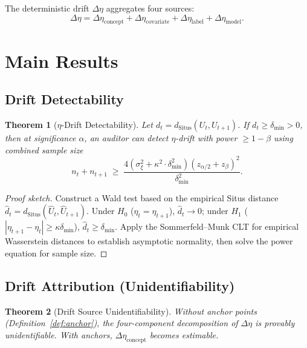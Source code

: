 \documentclass[12pt,a4paper]{article}
\newtheorem{theorem}{Theorem}[section]
\newcommand{\Situs}{\mathrm{Situs}}
\begin{document}
The deterministic drift $\Delta\eta$ aggregates four sources:
\begin{equation}\label{eq:drift-decomp}
    \Delta\eta = \Delta\eta_{\mathrm{concept}} +
    \Delta\eta_{\mathrm{covariate}} +
    \Delta\eta_{\mathrm{label}} +
    \Delta\eta_{\mathrm{model}}.
\end{equation}

\section{Main Results}

\subsection{Drift Detectability}

\begin{theorem}[$\eta$-Drift Detectability]
\label{thm:drift-detect}
Let $d_t = d_{\Situs}(U_t, U_{t+1})$. If $d_t \geq \delta_{\min} > 0$, then at significance $\alpha$, an auditor can detect $\eta$-drift with power $\geq 1-\beta$ using combined sample size
\begin{equation}\label{eq:drift-sample-size}
    n_t + n_{t+1} \;\geq\;
    \frac{4(\sigma^2_\xi + \kappa^2 \cdot \delta^2_{\min})(z_{\alpha/2} + z_\beta)^2}{\delta^2_{\min}}.
\end{equation}
\end{theorem}

\begin{proof}[Proof sketch]
Construct a Wald test based on the empirical Situs distance $\widehat{d}_t = d_{\Situs}(\widehat{U}_t, \widehat{U}_{t+1})$. Under $H_0$ ($\eta_t = \eta_{t+1}$), $\widehat{d}_t \to 0$; under $H_1$ ($|\eta_{t+1} - \eta_t| \geq \kappa\delta_{\min}$), $\widehat{d}_t \geq \delta_{\min}$. Apply the Sommerfeld--Munk CLT for empirical Wasserstein distances to establish asymptotic normality, then solve the power equation for sample size.
\end{proof}

\subsection{Drift Attribution (Unidentifiability)}

\begin{theorem}[Drift Source Unidentifiability]
\label{thm:drift-attr}
Without anchor points (Definition~\ref{def:anchor}), the four-component decomposition of $\Delta\eta$ is provably unidentifiable. With anchors, $\Delta\eta_{\mathrm{concept}}$ becomes estimable.
\end{theorem}
\end{document}

